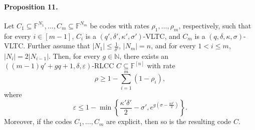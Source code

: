 \documentclass[10pt,a4paper]{article}
\begin{document}
\paragraph{Proposition 11.} Let $C_1\subseteq\mathbb F^{N_1},\ldots,C_m\subseteq\mathbb F^{N_m}$ be codes with rates $\rho_1,\ldots,\rho_m$, respectively, such that for every $i\in[m-1]$, $C_i$ is a $(q',\delta',\kappa',\sigma')$-VLTC, and $C_m$ is a $(q,\delta,\kappa,\sigma)$-VLTC. Further assume that $|N_1|\le\frac1{\delta'}$, $|N_m|=n$, and for every $1<i\le m$, $|N_i|=2|N_{i-1}|$. Then, for every $g\in\mathbb N$, there exists an $((m-1)q'+gq+1,\delta,\varepsilon)$-RLCC $C\subseteq\mathbb F^{[n]}$ with rate
\[\rho\ge1-\sum_{i=1}^m(1-\rho_i),\]
where
\[\varepsilon\le1-\min\left\{\frac{\kappa'\delta'}2-\sigma',e^{g(\sigma-\frac{\kappa\delta'}2)}\right\}.\]
Moreover, if the codes $C_1,\ldots,C_m$ are explicit, then so is the resulting code $C$.
\end{document}
